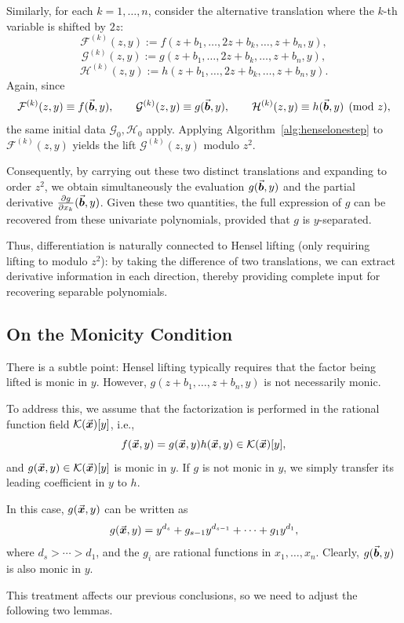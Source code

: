 \documentclass{article}
\numberwithin{equation}{section}
\begin{document}
Similarly, for each $k=1,\dots,n$, consider the alternative translation where the $k$-th variable is shifted by $2z$:
\[
\mathcal{F}^{(k)}(z,y):=f(z+b_1,\dots,2z+b_k,\dots,z+b_n,y),
\]
\[
\mathcal{G}^{(k)}(z,y):=g(z+b_1,\dots,2z+b_k,\dots,z+b_n,y),
\]
\[
\mathcal{H}^{(k)}(z,y):=h(z+b_1,\dots,2z+b_k,\dots,z+b_n,y).
\]
Again, since
\[
\mathcal{F}^{(k)}(z,y)\equiv f(\vec{\boldsymbol{b}},y),\qquad
\mathcal{G}^{(k)}(z,y)\equiv g(\vec{\boldsymbol{b}},y),\qquad
\mathcal{H}^{(k)}(z,y)\equiv h(\vec{\boldsymbol{b}},y) \pmod{z},
\]
the same initial data $\mathcal{G}_0,\mathcal{H}_0$ apply. Applying Algorithm~\ref{alg:henselonestep} to $\mathcal{F}^{(k)}(z,y)$ yields the lift $\mathcal{G}^{(k)}(z,y)$ modulo $z^2$.



Consequently, by carrying out these two distinct translations and expanding to order $z^2$, we obtain simultaneously the evaluation $g(\vec{\boldsymbol{b}},y)$ and the partial derivative $\frac{\partial g}{\partial x_k}(\vec{\boldsymbol{b}},y)$. Given these two quantities, the full expression of $g$ can be recovered from these univariate polynomials, provided that $g$ is $y$-separated.


Thus, differentiation is naturally connected to Hensel lifting (only requiring lifting to modulo $z^2$): by taking the difference of two translations, we can extract derivative information in each direction, thereby providing complete input for recovering separable polynomials.


\subsection*{On the Monicity Condition}

There is a subtle point: Hensel lifting typically requires that the factor being lifted is monic in \(y\). However, \(g(z+b_1,\dots,z+b_n,y)\) is not necessarily monic.

To address this, we assume that the factorization is performed in the rational function field \({\mathcal{K}}(\vec{\boldsymbol{x}})[y]\), i.e.,
\[
f(\vec{\boldsymbol{x}},y) = g(\vec{\boldsymbol{x}},y) h(\vec{\boldsymbol{x}},y) \in {\mathcal{K}}(\vec{\boldsymbol{x}})[y],
\]
and \(g(\vec{\boldsymbol{x}},y) \in {\mathcal{K}}(\vec{\boldsymbol{x}})[y]\) is monic in \(y\). If \(g\) is not monic in \(y\), we simply transfer its leading coefficient in \(y\) to \(h\).

In this case, \(g(\vec{\boldsymbol{x}},y)\) can be written as
\[
g(\vec{\boldsymbol{x}},y) = y^{d_s} + g_{s-1} y^{d_{s-1}} + \cdots + g_1 y^{d_1},
\]
where \(d_s > \cdots > d_1\), and the \(g_i\) are rational functions in \(x_1,\dots,x_n\). Clearly, \(g(\vec{\boldsymbol{b}},y)\) is also monic in \(y\).

This treatment affects our previous conclusions, so we need to adjust the following two lemmas.
\end{document}
